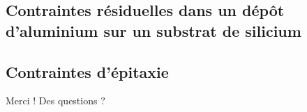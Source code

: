 \documentclass{beamer}
\begin{document}



\subsection{Contraintes résiduelles dans un dépôt d'aluminium sur un substrat de silicium} 
\subsection{Contraintes d'épitaxie} 


\begin{frame}
    \Huge{\centerline{Merci ! Des questions ?}}
\end{frame}
    







\end{document}
